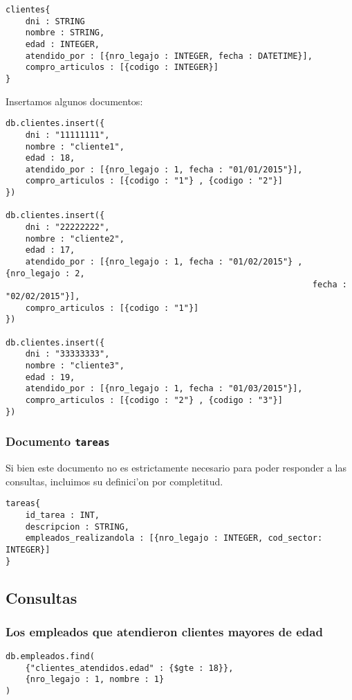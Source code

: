 \begin{verbatim}
clientes{
    dni : STRING
    nombre : STRING,
    edad : INTEGER,
    atendido_por : [{nro_legajo : INTEGER, fecha : DATETIME}],
    compro_articulos : [{codigo : INTEGER}]
}
\end{verbatim}

Insertamos algunos documentos:

\begin{verbatim}
db.clientes.insert({
    dni : "11111111",
    nombre : "cliente1",
    edad : 18,
    atendido_por : [{nro_legajo : 1, fecha : "01/01/2015"}],
    compro_articulos : [{codigo : "1"} , {codigo : "2"}]
})

db.clientes.insert({
    dni : "22222222",
    nombre : "cliente2",
    edad : 17,
    atendido_por : [{nro_legajo : 1, fecha : "01/02/2015"} , {nro_legajo : 2, 
                                                              fecha : "02/02/2015"}],
    compro_articulos : [{codigo : "1"}]
})

db.clientes.insert({
    dni : "33333333",
    nombre : "cliente3",
    edad : 19,
    atendido_por : [{nro_legajo : 1, fecha : "01/03/2015"}],
    compro_articulos : [{codigo : "2"} , {codigo : "3"}]
})
\end{verbatim}

\subsubsection{Documento \texttt{tareas}}

Si bien este documento no es estrictamente necesario para poder responder a las consultas, incluimos su definici'on por completitud.

\begin{verbatim}
tareas{
    id_tarea : INT,
    descripcion : STRING,
    empleados_realizandola : [{nro_legajo : INTEGER, cod_sector: INTEGER}]
}
\end{verbatim}

\subsection{Consultas}

\subsubsection{Los empleados que atendieron clientes mayores de edad}

\begin{verbatim}
db.empleados.find(
    {"clientes_atendidos.edad" : {$gte : 18}},
    {nro_legajo : 1, nombre : 1}
)
\end{verbatim}

